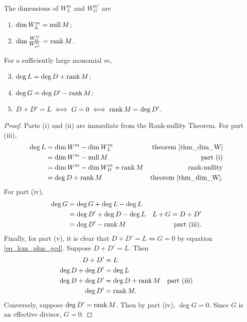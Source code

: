 \begin{proposition}
  \label{prop_deg_L_G}
  The dimensions of $W_L^m$ and $W_G^{m'}$ are
  \begin{enumerate}[label=(\roman*)]
    \item $\dim W_L^m    = \operatorname{null} M$;
    \item $\dim \frac {W_G^m} {W_{D'}^m} = \operatorname{rank} M$.
  \end{enumerate}
  For a sufficiently large monomial $m$,
  \begin{enumerate}[label=(\roman*)]
    \setcounter{enumi}{2}
    \item $\deg L = \deg D  + \operatorname{rank} M$;
    \item $\deg G = \deg D' - \operatorname{rank} M$;
    \item $D + D' = L \iff G = 0 \iff \operatorname{rank} M = \deg D'$.
  \end{enumerate}
\end{proposition}
\begin{proof}
  Parts (i) and (ii) are immediate from the Rank-nullity Theorem.
  For part (iii),
  \begin{align*}
    \deg L
      &= \dim W^m - \dim W_L^m & \text{theorem \ref{thm_dim_W}} \\
      &= \dim W^m - \operatorname{null} M & \text{part (i)} \\
      &= \dim W^m - \dim W_D^m + \operatorname{rank} M & \text{rank-nullity} \\
      &= \deg D + \operatorname{rank} M & \text{theorem \ref{thm_dim_W}}.
  \end{align*}
  For part (iv),
  \begin{align*}
    \deg G
      &= \deg G + \deg L - \deg L \\
      &= \deg D' + \deg D - \deg L & L + G = D + D' \\
      &= \deg D' - \operatorname{rank} M & \text{part (iii)}.
  \end{align*}
  Finally, for part (v), it is clear that $D + D' = L \iff G = 0$ by equation \ref{eq_lcm_plus_gcd}.
  Suppose $D + D' = L$. Then
  \begin{align*}
    D + D' &= L \\
    \deg D + \deg D' &= \deg L \\
    \deg D + \deg D' &= \deg D + \operatorname{rank} M & \text{part (iii)} \\
    \deg D' &= \operatorname{rank} M.
  \end{align*}
  Conversely, suppose $\deg D' = \operatorname{rank} M$.
  Then by part (iv), $\deg G = 0$.
  Since $G$ is an effective divisor, $G = 0$.
\end{proof}

